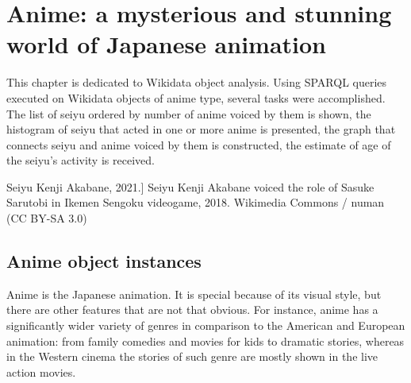 
\chapter{Anime: a mysterious and stunning world of Japanese animation\protect\footnotemark}




This chapter is dedicated to  Wikidata object analysis. Using SPARQL queries executed on Wikidata objects of anime type, several tasks were accomplished. The list of seiyu ordered by number of anime voiced by them is shown, the histogram of seiyu that acted in one or more anime is presented, the graph that connects seiyu and anime voiced by them is constructed, the estimate of age of the seiyu's activity is received.

\begin{marginfigure}[0.0cm]
{
	\setlength{\fboxsep}{0pt}%
	\setlength{\fboxrule}{1pt}%
}
\caption
[Seiyu Kenji Akabane, 2021.]
{
Seiyu Kenji Akabane voiced the role of Sasuke Sarutobi in Ikemen Sengoku videogame, 2018.\newline
Wikimedia Commons / numan (CC BY-SA 3.0)
}
\label{fig:seiyu}
\end{marginfigure}

\section{Anime object instances}

Anime is the Japanese animation. It is special because of its visual style, but there are other features that are not that obvious. For instance, anime has a significantly wider variety of genres in comparison to the American and European animation: from family comedies and movies for kids to dramatic stories, whereas in the Western cinema the stories of such genre are mostly shown in the live action movies.

